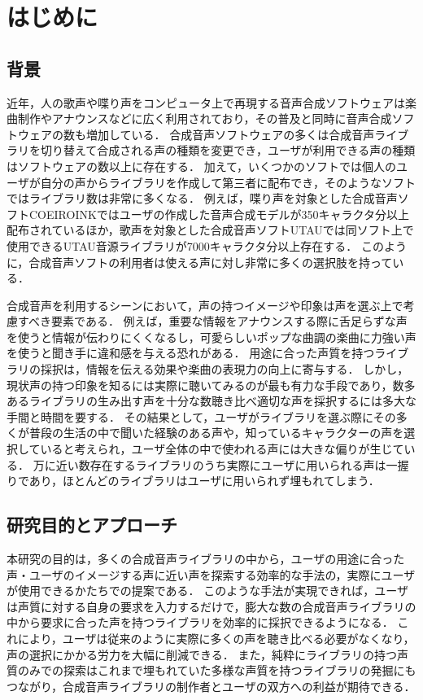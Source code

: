 \chapter{はじめに}
\thispagestyle{myheadings}

\section{背景}
近年，人の歌声や喋り声をコンピュータ上で再現する音声合成ソフトウェアは楽曲制作やアナウンスなどに広く利用されており，その普及と同時に音声合成ソフトウェアの数も増加している．
合成音声ソフトウェアの多くは合成音声ライブラリを切り替えて合成される声の種類を変更でき，ユーザが利用できる声の種類はソフトウェアの数以上に存在する．
加えて，いくつかのソフトでは個人のユーザが自分の声からライブラリを作成して第三者に配布でき，そのようなソフトではライブラリ数は非常に多くなる．
例えば，喋り声を対象とした合成音声ソフトCOEIROINKではユーザの作成した音声合成モデルが350キャラクタ分以上配布されているほか\cite{mycoeiroink}，歌声を対象とした合成音声ソフトUTAUでは同ソフト上で使用できるUTAU音源ライブラリが7000キャラクタ分以上存在する\cite{vdbutau}．
このように，合成音声ソフトの利用者は使える声に対し非常に多くの選択肢を持っている．

合成音声を利用するシーンにおいて，声の持つイメージや印象は声を選ぶ上で考慮すべき要素である．
例えば，重要な情報をアナウンスする際に舌足らずな声を使うと情報が伝わりにくくなるし，可愛らしいポップな曲調の楽曲に力強い声を使うと聞き手に違和感を与える恐れがある．
用途に合った声質を持つライブラリの採択は，情報を伝える効果や楽曲の表現力の向上に寄与する．
しかし，現状声の持つ印象を知るには実際に聴いてみるのが最も有力な手段であり，数多あるライブラリの生み出す声を十分な数聴き比べ適切な声を採択するには多大な手間と時間を要する．
その結果として，ユーザがライブラリを選ぶ際にその多くが普段の生活の中で聞いた経験のある声や，知っているキャラクターの声を選択していると考えられ，ユーザ全体の中で使われる声には大きな偏りが生じている．
万に近い数存在するライブラリのうち実際にユーザに用いられる声は一握りであり，ほとんどのライブラリはユーザに用いられず埋もれてしまう．

\section{研究目的とアプローチ}
本研究の目的は，多くの合成音声ライブラリの中から，ユーザの用途に合った声・ユーザのイメージする声に近い声を探索する効率的な手法の，実際にユーザが使用できるかたちでの提案である．
このような手法が実現できれば，ユーザは声質に対する自身の要求を入力するだけで，膨大な数の合成音声ライブラリの中から要求に合った声を持つライブラリを効率的に採択できるようになる．
これにより，ユーザは従来のように実際に多くの声を聴き比べる必要がなくなり，声の選択にかかる労力を大幅に削減できる．
また，純粋にライブラリの持つ声質のみでの探索はこれまで埋もれていた多様な声質を持つライブラリの発掘にもつながり，合成音声ライブラリの制作者とユーザの双方への利益が期待できる．

